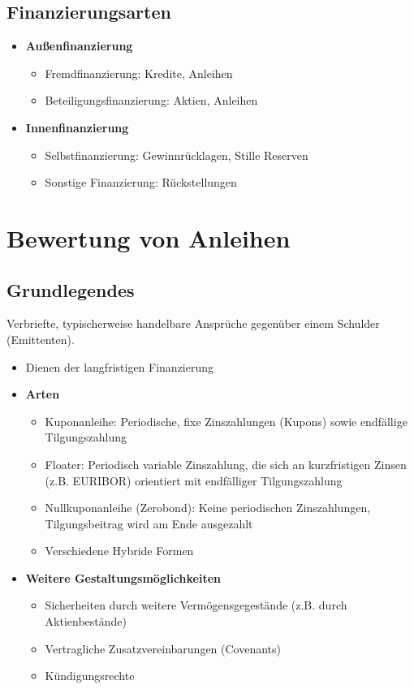 \subsection{Finanzierungsarten}
\begin{itemize}
	\item \textbf{Außenfinanzierung}
	\begin{itemize}
		\item Fremdfinanzierung: Kredite, Anleihen
		\item Beteiligungsfinanzierung: Aktien, Anleihen
	\end{itemize}
	\item \textbf{Innenfinanzierung}
	\begin{itemize}
		\item Selbstfinanzierung: Gewinnrücklagen, Stille Reserven
		\item Sonstige Finanzierung: Rückstellungen
	\end{itemize}
\end{itemize}



\section{Bewertung von Anleihen}

\subsection{Grundlegendes}
Verbriefte, typischerweise handelbare Ansprüche gegenüber einem Schulder (Emittenten).
\begin{itemize}
	\item Dienen der langfristigen Finanzierung
	\item \textbf{Arten}
	\begin{itemize}
		\item Kuponanleihe: Periodische, fixe Zinszahlungen (Kupons) sowie endfällige Tilgungszahlung
		\item Floater: Periodisch variable Zinszahlung, die sich an kurzfristigen Zinsen (z.B. EURIBOR) orientiert mit endfälliger Tilgungszahlung
		\item Nullkuponanleihe (Zerobond): Keine periodischen Zinszahlungen, Tilgungsbeitrag wird am Ende ausgezahlt
		\item Verschiedene Hybride Formen
	\end{itemize}
	\item \textbf{Weitere Gestaltungsmöglichkeiten}
	\begin{itemize}
		\item Sicherheiten durch weitere Vermögensgegestände (z.B. durch Aktienbestände)
		\item Vertragliche Zusatzvereinbarungen (Covenants)
		\item Kündigungsrechte
	\end{itemize}
\end{itemize}



